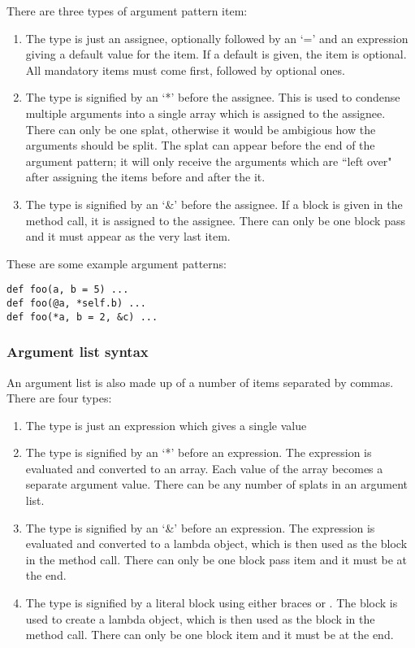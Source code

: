 There are three types of argument pattern item:

\begin{enumerate}
  \item The  type is just an assignee, optionally followed by an `=' and an expression giving a default value for the item. If a default is given, the item is optional. All mandatory items must come first, followed by optional ones.
  
  \item The  type is signified by an `*' before the assignee. This is used to condense multiple arguments into a single array which is assigned to the assignee. There can only be one splat, otherwise it would be ambigious how the arguments should be split. The splat can appear before the end of the argument pattern; it will only receive the arguments which are ``left over" after assigning the items before and after the it.
  
  \item The  type is signified by an `\&' before the assignee. If a block is given in the method call, it is assigned to the assignee. There can only be one block pass and it must appear as the very last item.
\end{enumerate}

These are some example argument patterns:

\begin{lstlisting}
def foo(a, b = 5) ...
def foo(@a, *self.b) ...
def foo(*a, b = 2, &c) ...
\end{lstlisting}

\subsubsection{Argument list syntax}

An argument list is also made up of a number of items separated by commas. There are four types:

\begin{enumerate}
  \item The  type is just an expression which gives a single value
  \item The  type is signified by an `*' before an expression. The expression is evaluated and converted to an array. Each value of the array becomes a separate argument value. There can be any number of splats in an argument list.
  \item The  type is signified by an `\&' before an expression. The expression is evaluated and converted to a lambda object, which is then used as the block in the method call. There can only be one block pass item and it must be at the end.
  \item The  type is signified by a literal block using either braces or   . The block is used to create a lambda object, which is then used as the block in the method call. There can only be one block item and it must be at the end.
\end{enumerate}

